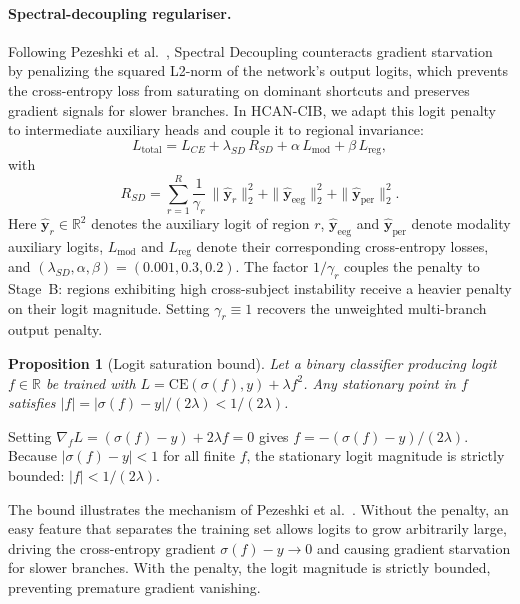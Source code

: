 \documentclass[a4paper,fleqn]{cas-sc}
\newtheorem{proposition}{Proposition}
\begin{document}
\paragraph{Spectral-decoupling regulariser.}
Following Pezeshki et al.~\citep{pezeshki2021gradient}, Spectral Decoupling counteracts gradient starvation by penalizing the squared L2-norm of the network's output logits, which prevents the cross-entropy loss from saturating on dominant shortcuts and preserves gradient signals for slower branches. In HCAN-CIB, we adapt this logit penalty to intermediate auxiliary heads and couple it to regional invariance:
\begin{equation}
L_{\mathrm{total}}=L_{CE}+\lambda_{SD}\,R_{SD}+\alpha\,L_{\mathrm{mod}}+\beta\,L_{\mathrm{reg}},
\label{eq:total}
\end{equation}
with
\begin{equation}
R_{SD}=\sum_{r=1}^{R}\frac{1}{\gamma_r}\,\|\hat{\mathbf{y}}_r\|_2^2+\|\hat{\mathbf{y}}_{\mathrm{eeg}}\|_2^2+\|\hat{\mathbf{y}}_{\mathrm{per}}\|_2^2 .
\label{eq:sd}
\end{equation}
Here $\hat{\mathbf{y}}_r\in\mathbb{R}^2$ denotes the auxiliary logit of region $r$, $\hat{\mathbf{y}}_{\mathrm{eeg}}$ and $\hat{\mathbf{y}}_{\mathrm{per}}$ denote modality auxiliary logits, $L_{\mathrm{mod}}$ and $L_{\mathrm{reg}}$ denote their corresponding cross-entropy losses, and $(\lambda_{SD},\alpha,\beta)=(0.001,0.3,0.2)$. The factor $1/\gamma_r$ couples the penalty to Stage~B: regions exhibiting high cross-subject instability receive a heavier penalty on their logit magnitude. Setting $\gamma_r\equiv1$ recovers the unweighted multi-branch output penalty.

\begin{proposition}[Logit saturation bound]
Let a binary classifier producing logit $f\in\mathbb{R}$ be trained with $L=\mathrm{CE}(\sigma(f),y)+\lambda f^2$. Any stationary point in $f$ satisfies $|f|=|\sigma(f)-y|/(2\lambda)<1/(2\lambda)$.
\end{proposition}
\begin{pf}
Setting $\nabla_{f}L=(\sigma(f)-y)+2\lambda f=0$ gives $f=-(\sigma(f)-y)/(2\lambda)$. Because $|\sigma(f)-y|<1$ for all finite $f$, the stationary logit magnitude is strictly bounded: $|f|<1/(2\lambda)$.
\end{pf}
The bound illustrates the mechanism of Pezeshki et al.~\citep{pezeshki2021gradient}. Without the penalty, an easy feature that separates the training set allows logits to grow arbitrarily large, driving the cross-entropy gradient $\sigma(f)-y\to0$ and causing gradient starvation for slower branches. With the penalty, the logit magnitude is strictly bounded, preventing premature gradient vanishing.
\end{document}

